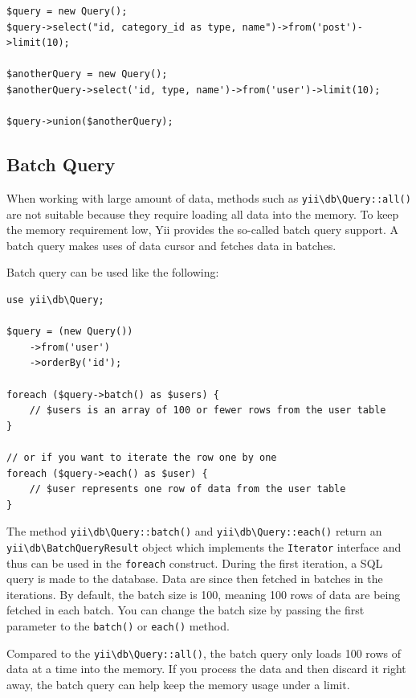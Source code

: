 \lstset{language=php}\begin{lstlisting}
$query = new Query();
$query->select("id, category_id as type, name")->from('post')->limit(10);

$anotherQuery = new Query();
$anotherQuery->select('id, type, name')->from('user')->limit(10);

$query->union($anotherQuery);
\end{lstlisting}
\subsection{Batch Query}
When working with large amount of data, methods such as \texttt{yii{\allowbreak{}\textbackslash}db{\allowbreak{}\textbackslash}Query\allowbreak{}::\allowbreak{}all()} are not suitable
because they require loading all data into the memory. To keep the memory requirement low, Yii
provides the so-called batch query support. A batch query makes uses of data cursor and fetches
data in batches.

Batch query can be used like the following:

\lstset{language=php}\begin{lstlisting}
use yii\db\Query;

$query = (new Query())
    ->from('user')
    ->orderBy('id');

foreach ($query->batch() as $users) {
    // $users is an array of 100 or fewer rows from the user table
}

// or if you want to iterate the row one by one
foreach ($query->each() as $user) {
    // $user represents one row of data from the user table
}
\end{lstlisting}
The method \texttt{yii{\allowbreak{}\textbackslash}db{\allowbreak{}\textbackslash}Query\allowbreak{}::\allowbreak{}batch()} and \texttt{yii{\allowbreak{}\textbackslash}db{\allowbreak{}\textbackslash}Query\allowbreak{}::\allowbreak{}each()} return an \texttt{yii{\allowbreak{}\textbackslash}db{\allowbreak{}\textbackslash}BatchQueryResult} object
which implements the \lstinline|Iterator| interface and thus can be used in the \lstinline|foreach| construct.
During the first iteration, a SQL query is made to the database. Data are since then fetched in batches
in the iterations. By default, the batch size is 100, meaning 100 rows of data are being fetched in each batch.
You can change the batch size by passing the first parameter to the \lstinline|batch()| or \lstinline|each()| method.

Compared to the \texttt{yii{\allowbreak{}\textbackslash}db{\allowbreak{}\textbackslash}Query\allowbreak{}::\allowbreak{}all()}, the batch query only loads 100 rows of data at a time into the memory.
If you process the data and then discard it right away, the batch query can help keep the memory usage under a limit.

